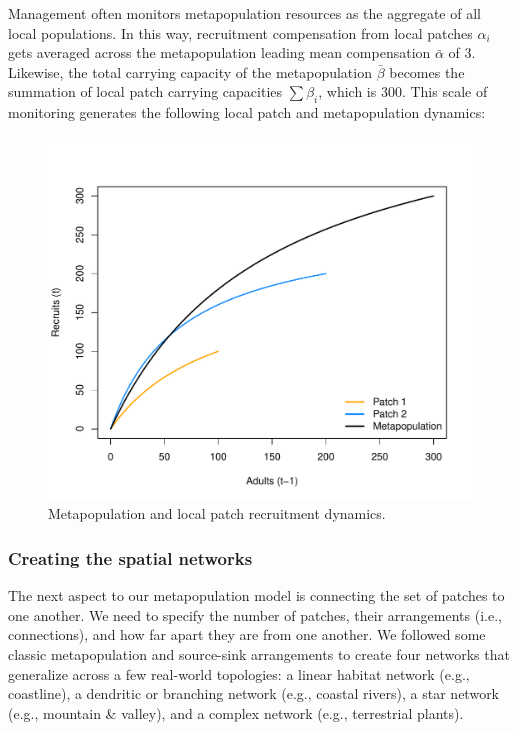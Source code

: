 \documentclass[]{article}
\begin{document}
Management often monitors metapopulation resources as the aggregate of
all local populations. In this way, recruitment compensation from local
patches \(\alpha_i\) gets averaged across the metapopulation leading
mean compensation \(\bar{\alpha}\) of 3. Likewise, the total carrying
capacity of the metapopulation \(\bar{\beta}\) becomes the summation of
local patch carrying capacities \(\sum\beta_i\), which is 300. This
scale of monitoring generates the following local patch and
metapopulation dynamics:

\begin{figure}[H]

{\centering \includegraphics{Managing_for_ecological_surprises_in_metapopulations_makeHTML_files/figure-latex/recruit curves-1} 

}

\caption{Metapopulation and local patch recruitment dynamics.}\label{fig:recruit curves}
\end{figure}

\subsubsection{Creating the spatial
networks}\label{creating-the-spatial-networks}

The next aspect to our metapopulation model is connecting the set of
patches to one another. We need to specify the number of patches, their
arrangements (i.e., connections), and how far apart they are from one
another. We followed some classic metapopulation and source-sink
arrangements to create four networks that generalize across a few
real-world topologies: a linear habitat network (e.g., coastline), a
dendritic or branching network (e.g., coastal rivers), a star network
(e.g., mountain \& valley), and a complex network (e.g., terrestrial
plants).
\end{document}
